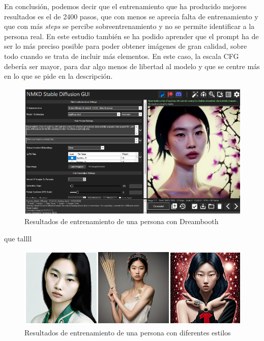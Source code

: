 En conclusión, podemos decir que el entrenamiento que ha producido mejores resultados es el de 2400 pasos, que con menos se aprecia falta de entrenamiento y que con más \textit{steps} se percibe sobreentrenamiento y no se permite identificar a la persona real. En este estudio también se ha podido aprender que el prompt ha de ser lo más preciso posible para poder obtener imágenes de gran calidad, sobre todo cuando se trata de incluir más elementos. En este caso, la escala CFG debería ser mayor, para dar algo menos de libertad al modelo y que se centre más en lo que se pide en la descripción.


\begin{figure}[!htb]
	\centering
	\includegraphics[width = 1
	\textwidth]{Imagenes/Vectorial/hoyeon1.png}
	\caption{Resultados de entrenamiento de una persona con Dreambooth}
	\label{fig:hoyeonsd}
\end{figure}

que tallll\\

\begin{figure}[!htb]
	\centering
	\includegraphics[width = 1
	\textwidth]{Imagenes/Vectorial/hoyeon_results.png}
	\caption{Resultados de entrenamiento de una persona con diferentes estilos}
	\label{fig:imagshoyeon}
\end{figure}

